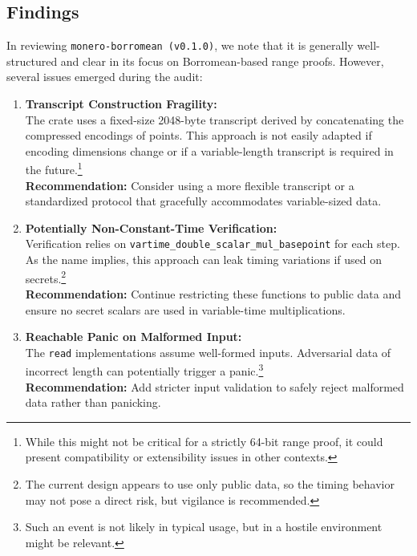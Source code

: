 \documentclass[12pt,a4paper]{article}
\begin{document}
\vspace{1em}

\subsection{Findings}

In reviewing \texttt{monero-borromean (v0.1.0)}, we note that it is generally well-structured and clear in its focus on Borromean-based range proofs. However, several issues emerged during the audit:

\begin{enumerate}
    \item \textbf{Transcript Construction Fragility:}\\
    The crate uses a fixed-size 2048-byte transcript derived by concatenating the compressed encodings of points. This approach is not easily adapted if encoding dimensions change or if a variable-length transcript is required in the future.\footnote{While this might not be critical for a strictly 64-bit range proof, it could present compatibility or extensibility issues in other contexts.}\\
    \textbf{Recommendation:} Consider using a more flexible transcript or a standardized protocol that gracefully accommodates variable-sized data.

    \item \textbf{Potentially Non-Constant-Time Verification:}\\
    Verification relies on \texttt{vartime\_double\_scalar\_mul\_basepoint} for each step. As the name implies, this approach can leak timing variations if used on secrets.\footnote{The current design appears to use only public data, so the timing behavior may not pose a direct risk, but vigilance is recommended.}\\
    \textbf{Recommendation:} Continue restricting these functions to public data and ensure no secret scalars are used in variable-time multiplications.

    \item \textbf{Reachable Panic on Malformed Input:}\\
    The \texttt{read} implementations assume well-formed inputs. Adversarial data of incorrect length can potentially trigger a panic.\footnote{Such an event is not likely in typical usage, but in a hostile environment might be relevant.}\\
    \textbf{Recommendation:} Add stricter input validation to safely reject malformed data rather than panicking.


\end{enumerate}
\end{document}
